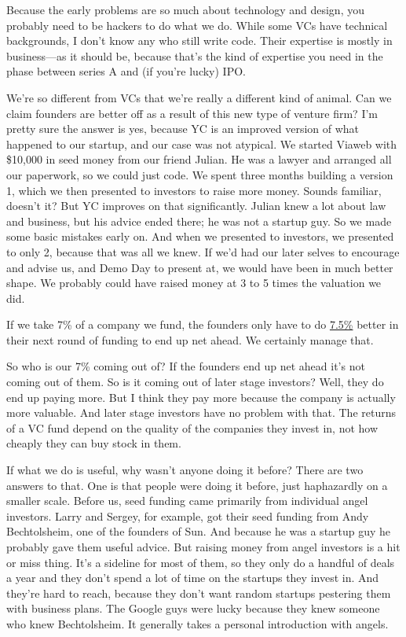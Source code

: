 \documentclass[12pt]{book}
\begin{document}
Because the early problems are so much about technology and design, you
probably need to be hackers to do what we do. While some VCs have
technical backgrounds, I don't know any who still write code. Their
expertise is mostly in business---as it should be, because that's the
kind of expertise you need in the phase between series A and (if you're
lucky) IPO.

We're so different from VCs that we're really a different kind of
animal. Can we claim founders are better off as a result of this new
type of venture firm? I'm pretty sure the answer is yes, because YC is
an improved version of what happened to our startup, and our case was
not atypical. We started Viaweb with \$10,000 in seed money from our
friend Julian. He was a lawyer and arranged all our paperwork, so we
could just code. We spent three months building a version 1, which we
then presented to investors to raise more money. Sounds familiar,
doesn't it? But YC improves on that significantly. Julian knew a lot
about law and business, but his advice ended there; he was not a startup
guy. So we made some basic mistakes early on. And when we presented to
investors, we presented to only 2, because that was all we knew. If we'd
had our later selves to encourage and advise us, and Demo Day to present
at, we would have been in much better shape. We probably could have
raised money at 3 to 5 times the valuation we did.

If we take 7\% of a company we fund, the founders only have to do
\href{equity.html}{7.5\%} better in their next round of funding to end
up net ahead. We certainly manage that.

So who is our 7\% coming out of? If the founders end up net ahead it's
not coming out of them. So is it coming out of later stage investors?
Well, they do end up paying more. But I think they pay more because the
company is actually more valuable. And later stage investors have no
problem with that. The returns of a VC fund depend on the quality of the
companies they invest in, not how cheaply they can buy stock in them.

If what we do is useful, why wasn't anyone doing it before? There are
two answers to that. One is that people were doing it before, just
haphazardly on a smaller scale. Before us, seed funding came primarily
from individual angel investors. Larry and Sergey, for example, got
their seed funding from Andy Bechtolsheim, one of the founders of Sun.
And because he was a startup guy he probably gave them useful advice.
But raising money from angel investors is a hit or miss thing. It's a
sideline for most of them, so they only do a handful of deals a year and
they don't spend a lot of time on the startups they invest in. And
they're hard to reach, because they don't want random startups pestering
them with business plans. The Google guys were lucky because they knew
someone who knew Bechtolsheim. It generally takes a personal
introduction with angels.
\end{document}
